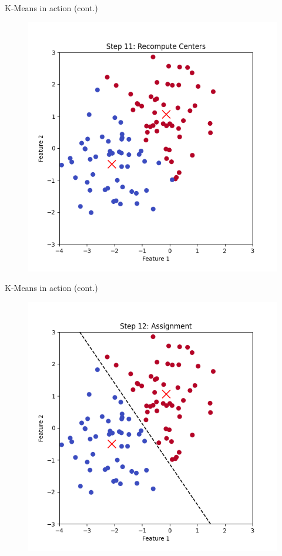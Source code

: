\documentclass[serif, aspectratio=169]{beamer}
\begin{document}
\begin{frame}{K-Means in action (cont.)}
    \begin{figure}
        \centering
        \includegraphics[scale=0.45]{pic/figs/kmeans_step_11_recompute_centers.png}
    \end{figure}
\end{frame}
\begin{frame}{K-Means in action (cont.)}
    \begin{figure}
        \centering
        \includegraphics[scale=0.45]{pic/figs/kmeans_step_12_assignment.png}
    \end{figure}
\end{frame}
\end{document}
